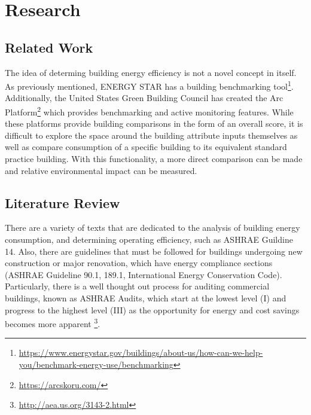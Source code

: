 \section*{Research}
\label{sec:literature_review}

\subsection{Related Work}
The idea of determing building energy efficiency is not a novel concept in itself.  As previously mentioned, ENERGY STAR has a building benchmarking tool\footnote{\href{https://www.energystar.gov/buildings/about-us/how-can-we-help-you/benchmark-energy-use/benchmarking }{\url{https://www.energystar.gov/buildings/about-us/how-can-we-help-you/benchmark-energy-use/benchmarking}}}.  Additionally, the United States Green Building Council has created the Arc Platform\footnote{\href{https://arcskoru.com/}{\url{https://arcskoru.com/}}} which provides benchmarking and active monitoring features.  While these platforms provide building comparisons in the form of an overall score, it is difficult to explore the space around the building attribute inputs themselves as well as compare consumption of a specific building to its equivalent standard practice building.  With this functionality, a more direct comparison can be made and relative environmental impact can be measured.

\subsection{Literature Review}

There are a variety of texts that are dedicated to the analysis of building energy consumption, and determining operating efficiency, such as ASHRAE Guildine 14.  Also, there are guidelines that must be followed for buildings undergoing new construction or major renovation, which have energy compliance sections (ASHRAE Guideline 90.1, 189.1, International Energy Conservation Code).  Particularly, there is a well thought out process for auditing commercial buildings, known as ASHRAE Audits, which start at the lowest level (I) and progress to the highest level (III) as the opportunity for energy and cost savings becomes more apparent \footnote{\href{http://aea.us.org/3143-2.html}{\url{http://aea.us.org/3143-2.html}}}.  